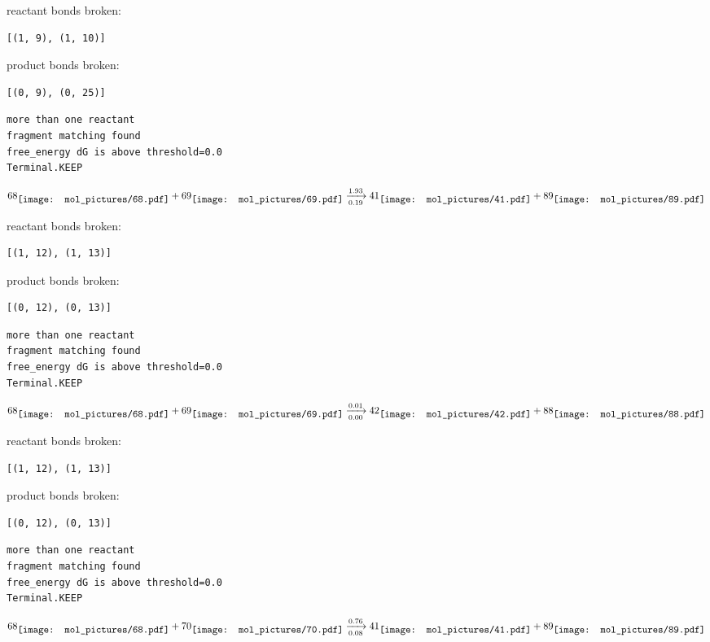 \documentclass{article}
\begin{document}
reactant bonds broken:\begin{verbatim}
[(1, 9), (1, 10)]
\end{verbatim}
product bonds broken:\begin{verbatim}
[(0, 9), (0, 25)]
\end{verbatim}




\vspace{1cm}
\begin{verbatim}
more than one reactant
fragment matching found
free_energy dG is above threshold=0.0
Terminal.KEEP
\end{verbatim}
$$
68
\raisebox{-.5\height}{\texttt{[image: mol\_pictures/68.pdf]}}
+
69
\raisebox{-.5\height}{\texttt{[image: mol\_pictures/69.pdf]}}
\xrightarrow[0.19]{1.93}
41
\raisebox{-.5\height}{\texttt{[image: mol\_pictures/41.pdf]}}
+
89
\raisebox{-.5\height}{\texttt{[image: mol\_pictures/89.pdf]}}
$$


reactant bonds broken:\begin{verbatim}
[(1, 12), (1, 13)]
\end{verbatim}
product bonds broken:\begin{verbatim}
[(0, 12), (0, 13)]
\end{verbatim}




\vspace{1cm}
\begin{verbatim}
more than one reactant
fragment matching found
free_energy dG is above threshold=0.0
Terminal.KEEP
\end{verbatim}
$$
68
\raisebox{-.5\height}{\texttt{[image: mol\_pictures/68.pdf]}}
+
69
\raisebox{-.5\height}{\texttt{[image: mol\_pictures/69.pdf]}}
\xrightarrow[0.00]{0.01}
42
\raisebox{-.5\height}{\texttt{[image: mol\_pictures/42.pdf]}}
+
88
\raisebox{-.5\height}{\texttt{[image: mol\_pictures/88.pdf]}}
$$


reactant bonds broken:\begin{verbatim}
[(1, 12), (1, 13)]
\end{verbatim}
product bonds broken:\begin{verbatim}
[(0, 12), (0, 13)]
\end{verbatim}




\vspace{1cm}
\begin{verbatim}
more than one reactant
fragment matching found
free_energy dG is above threshold=0.0
Terminal.KEEP
\end{verbatim}
$$
68
\raisebox{-.5\height}{\texttt{[image: mol\_pictures/68.pdf]}}
+
70
\raisebox{-.5\height}{\texttt{[image: mol\_pictures/70.pdf]}}
\xrightarrow[0.08]{0.76}
41
\raisebox{-.5\height}{\texttt{[image: mol\_pictures/41.pdf]}}
+
89
\raisebox{-.5\height}{\texttt{[image: mol\_pictures/89.pdf]}}
$$
\end{document}
